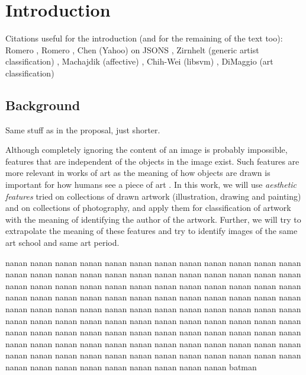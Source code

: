 \documentclass[11pt,a4paper,draft]{report}
\begin{document}
\chapter{Introduction}
\begin{multicols}{2}

Citations useful for the introduction (and for the remaining of the text too):
Romero \cite{jma12clas}, Romero \cite{rmc12ajs}, Chen (Yahoo) on JSONS
\cite{chen09yahoo}, Zirnhelt (generic artist classification)
\cite{zirnhelt07art}, Machajdik (affective) \cite{mach10clas}, Chih-Wei
(libsvm) \cite{hcl03svm}, DiMaggio (art classification) \cite{dimaggio87art}

\section{Background}

Same stuff as in the proposal, just shorter.

Although completely ignoring the content of an image is probably impossible,
features that are independent of the objects in the image exist.  Such features
are more relevant in works of art \cite{zirnhelt07art} as the meaning of how
objects are drawn is important for how humans see a piece of art
\cite{mach10clas}.  In this work, we will use \emph{aesthetic features} tried
on collections of drawn artwork (illustration, drawing and painting) and on
collections of photography, and apply them for classification of artwork with
the meaning of identifying the author of the artwork.  Further, we will try to
extrapolate the meaning of these features and try to identify images of the
same art school and same art period.

nanan nanan nanan nanan nanan nanan nanan nanan nanan nanan nanan nanan nanan
nanan nanan nanan nanan nanan nanan nanan nanan nanan nanan nanan nanan nanan
nanan nanan nanan nanan nanan nanan nanan nanan nanan nanan nanan nanan nanan
nanan nanan nanan nanan nanan nanan nanan nanan nanan nanan nanan nanan nanan
nanan nanan nanan nanan nanan nanan nanan nanan nanan nanan nanan nanan nanan
nanan nanan nanan nanan nanan nanan nanan nanan nanan nanan nanan nanan nanan
nanan nanan nanan nanan nanan nanan nanan nanan nanan nanan nanan nanan nanan
nanan nanan nanan nanan nanan nanan nanan nanan nanan nanan nanan nanan nanan
nanan nanan nanan nanan nanan nanan nanan nanan nanan nanan nanan nanan nanan
batman


\end{multicols}
\end{document}
